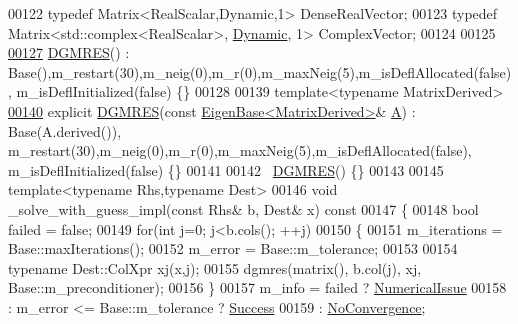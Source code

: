\begin{DoxyCode}
00122     \textcolor{keyword}{typedef} Matrix<RealScalar,Dynamic,1> DenseRealVector; 
00123     \textcolor{keyword}{typedef} Matrix<std::complex<RealScalar>, \hyperlink{namespace_eigen_ad81fa7195215a0ce30017dfac309f0b2}{Dynamic}, 1> ComplexVector;
00124  
00125     
\hyperlink{class_eigen_1_1_d_g_m_r_e_s_a17bd25826b56c39bc7cc4ce8fbf8a848}{00127}   \hyperlink{class_eigen_1_1_d_g_m_r_e_s_a17bd25826b56c39bc7cc4ce8fbf8a848}{DGMRES}() : Base(),m\_restart(30),m\_neig(0),m\_r(0),m\_maxNeig(5),m\_isDeflAllocated(false),
      m\_isDeflInitialized(false) \{\}
00128 
00139   \textcolor{keyword}{template}<\textcolor{keyword}{typename} MatrixDerived>
\hyperlink{class_eigen_1_1_d_g_m_r_e_s_a800fcf37c0ac66f76d5c070e4aeae2a7}{00140}   \textcolor{keyword}{explicit} \hyperlink{class_eigen_1_1_d_g_m_r_e_s_a800fcf37c0ac66f76d5c070e4aeae2a7}{DGMRES}(\textcolor{keyword}{const} \hyperlink{group___core___module_struct_eigen_1_1_eigen_base}{EigenBase<MatrixDerived>}& 
      \hyperlink{group___core___module_class_eigen_1_1_matrix}{A}) : Base(A.derived()), m\_restart(30),m\_neig(0),m\_r(0),m\_maxNeig(5),m\_isDeflAllocated(false),
      m\_isDeflInitialized(false) \{\}
00141 
00142   ~\hyperlink{class_eigen_1_1_d_g_m_r_e_s}{DGMRES}() \{\}
00143   
00145   \textcolor{keyword}{template}<\textcolor{keyword}{typename} Rhs,\textcolor{keyword}{typename} Dest>
00146   \textcolor{keywordtype}{void} \_solve\_with\_guess\_impl(\textcolor{keyword}{const} Rhs& b, Dest& x)\textcolor{keyword}{ const}
00147 \textcolor{keyword}{  }\{    
00148     \textcolor{keywordtype}{bool} failed = \textcolor{keyword}{false};
00149     \textcolor{keywordflow}{for}(\textcolor{keywordtype}{int} j=0; j<b.cols(); ++j)
00150     \{
00151       m\_iterations = Base::maxIterations();
00152       m\_error = Base::m\_tolerance;
00153       
00154       \textcolor{keyword}{typename} Dest::ColXpr xj(x,j);
00155       dgmres(matrix(), b.col(j), xj, Base::m\_preconditioner);
00156     \}
00157     m\_info = failed ? \hyperlink{group__enums_gga85fad7b87587764e5cf6b513a9e0ee5eaaf9b736d310a664e7729d163a035cc5f}{NumericalIssue}
00158            : m\_error <= Base::m\_tolerance ? \hyperlink{group__enums_gga85fad7b87587764e5cf6b513a9e0ee5ea52581b035f4b59c203b8ff999ef5fcea}{Success}
00159            : \hyperlink{group__enums_gga85fad7b87587764e5cf6b513a9e0ee5eaba1c8763d1179778070f365ecc4157a8}{NoConvergence};

\end{DoxyCode}
